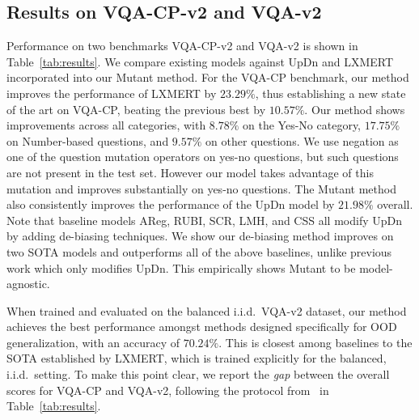     \subsection{Results on VQA-CP-v2 and VQA-v2}
    Performance on two benchmarks VQA-CP-v2 and VQA-v2 is shown in Table~\ref{tab:results}.
    We compare existing models against UpDn and LXMERT incorporated into our Mutant method.
    For the VQA-CP benchmark, our method improves the performance of LXMERT by $23.29\%$, thus establishing a new state of the art on VQA-CP, beating the previous best by $10.57\%$.
    Our method shows improvements across all categories, with $8.78\%$ on the Yes-No category, $17.75\%$ on Number-based questions, and $9.57\%$ on other questions.
    We use negation as one of the question mutation operators on yes-no questions, but such questions are not present in the test set.
    However our model takes advantage of this mutation and improves substantially on yes-no questions.
    The Mutant method also consistently improves the performance of the UpDn model by $21.98\%$ overall.
    Note that baseline models AReg, RUBI, SCR, LMH, and CSS all modify UpDn by adding de-biasing techniques. 
    We show our de-biasing method improves on two SOTA models and outperforms all of the above baselines, unlike previous work which only modifies UpDn.
    This empirically shows Mutant to be model-agnostic.
    
    When trained and evaluated on the balanced i.i.d.~VQA-v2 dataset, our method achieves the best performance amongst methods designed specifically for OOD generalization, with an accuracy of $70.24\%$.
    This is closest among baselines to the SOTA established by LXMERT, which is trained explicitly for the balanced, i.i.d.~setting.
    To make this point clear, we report the \textit{gap} between the overall scores for VQA-CP and VQA-v2, following the protocol from~\citet{chen2020counterfactual} in Table~\ref{tab:results}.
    
    
